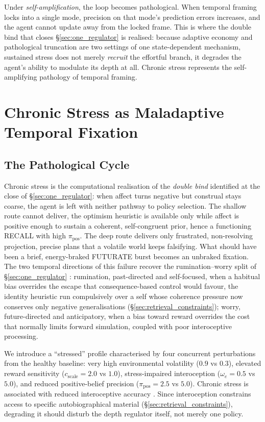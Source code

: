 \documentclass[11pt,a4paper]{article}
\newcommand{\rr}{\color{red!70!black}}
\begin{document}
Under \emph{self-amplification}, the loop becomes pathological. When temporal framing locks into a single mode, precision on that mode's prediction errors increases, and the agent cannot update away from the locked frame. {\rr This is where the double bind that closes \S\ref{sec:one_regulator} is realised: because adaptive economy and pathological truncation are two settings of one state-dependent mechanism, sustained stress does not merely \emph{recruit} the effortful branch, it degrades the agent's ability to modulate its depth at all.} Chronic stress represents the self-amplifying pathology of temporal framing.


\section{Chronic Stress as Maladaptive Temporal Fixation}\label{sec:chronic_stress}

\subsection{The Pathological Cycle}\label{sec:pathological_cycle}

{\rr Chronic stress is the computational realisation of the \emph{double bind} identified at the close of \S\ref{sec:one_regulator}: when affect turns negative but construal stays coarse, the agent is left with neither pathway to policy selection. The shallow route cannot deliver, the optimism heuristic is available only while affect is positive enough to sustain a coherent, self-congruent prior, hence a functioning RECALL with high $\pi_{\text{pos}}$. The deep route delivers only frustrated, non-resolving projection, precise plans that a volatile world keeps falsifying. What should have been a brief, energy-braked FUTURATE burst becomes an unbraked fixation. The two temporal directions of this failure recover the rumination--worry split of \S\ref{sec:one_regulator} \citep{fresco2002, nolenhoeksema2008}: rumination, past-directed and self-focused, when a habitual bias overrides the escape that consequence-based control would favour, the identity heuristic run compulsively over a self whose coherence pressure now conserves only negative generalisations (\S\ref{sec:retrieval_constraints}); worry, future-directed and anticipatory, when a bias toward reward overrides the cost that normally limits forward simulation, coupled with poor interoceptive processing.}


We introduce a ``stressed'' profile characterised by four concurrent perturbations from the healthy baseline: very high environmental volatility ($0.9$ vs $0.3$), elevated reward sensitivity ($c_{\text{scale}} = 2.0$ vs $1.0$), stress-impaired interoception ($\omega_e = 0.5$ vs $5.0$), and reduced positive-belief precision ($\pi_{\text{pos}} = 2.5$ vs $5.0$). Chronic stress is associated with reduced interoceptive accuracy \citep{barrett2017theory, seth2016interoceptive}. Since interoception constrains access to specific autobiographical material (\S\ref{sec:retrieval_constraints}), degrading it should disturb the depth regulator itself, not merely one policy.
\end{document}
